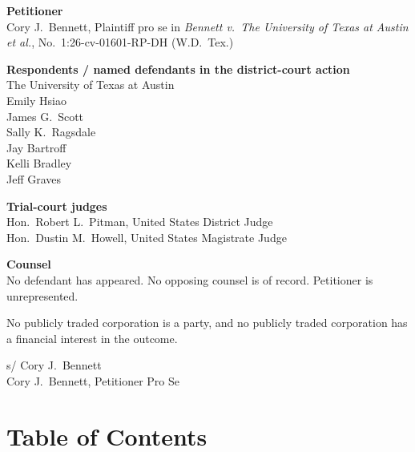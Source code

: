 \documentclass[14pt]{extarticle}
\begin{document}
\begin{singlespace}
\noindent\textbf{Petitioner}\\
Cory J.\ Bennett, Plaintiff pro se in \textit{Bennett v.\ The University of Texas at Austin et al.}, No.\ 1:26-cv-01601-RP-DH (W.D.\ Tex.)

\vspace{0.55em}
\noindent\textbf{Respondents / named defendants in the district-court action}\\
The University of Texas at Austin\\
Emily Hsiao\\
James G.\ Scott\\
Sally K.\ Ragsdale\\
Jay Bartroff\\
Kelli Bradley\\
Jeff Graves

\vspace{0.55em}
\noindent\textbf{Trial-court judges}\\
Hon.\ Robert L.\ Pitman, United States District Judge\\
Hon.\ Dustin M.\ Howell, United States Magistrate Judge

\vspace{0.55em}
\noindent\textbf{Counsel}\\
No defendant has appeared. No opposing counsel is of record. Petitioner is unrepresented.
\end{singlespace}

\vspace{0.9em}
\noindent No publicly traded corporation is a party, and no publicly traded corporation has a financial interest in the outcome.

\vspace{1.0em}
\noindent s/ Cory J.\ Bennett\\
Cory J.\ Bennett, Petitioner Pro Se

\clearpage
\section*{Table of Contents}
\end{document}
